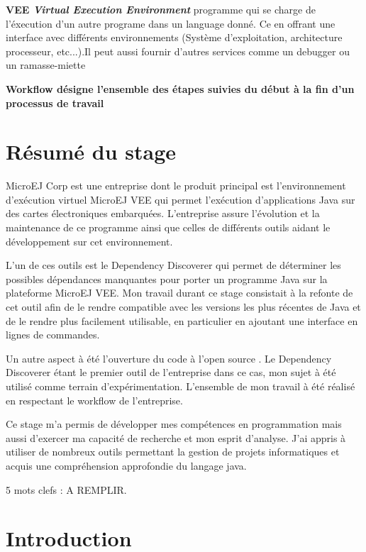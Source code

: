 \documentclass[french,a4paper,12pt]{report}
\begin{document}
\bigskip

\hypertarget{VEE}{\noindent\textbf{VEE \emph{Virtual Execution Environment}} programme qui se charge de l'éxecution d'un autre programe dans un language donné. Ce en offrant une interface avec différents environnements (Système d'exploitation, architecture processeur, etc...).Il peut aussi fournir d'autres services comme un debugger ou un ramasse-miette}

\hypertarget{Workflow}{\noindent\textbf{Workflow désigne l'ensemble des étapes suivies du début à la fin d'un processus de travail}}

\chapter*{Résumé du stage}

MicroEJ Corp est une entreprise dont le produit principal est l'environnement d’exécution virtuel MicroEJ VEE qui permet l’exécution d'applications Java sur des cartes électroniques embarquées. L'entreprise assure l'évolution et la maintenance de ce programme ainsi que celles de différents outils aidant le développement sur cet environnement.

L'un de ces outils est le Dependency Discoverer qui permet de déterminer les possibles dépendances manquantes pour porter un programme Java sur la plateforme MicroEJ VEE. Mon travail durant ce stage consistait à la refonte de cet outil afin de le rendre compatible avec les versions les plus récentes de Java et de le rendre plus facilement utilisable, en particulier en ajoutant une interface en lignes de commandes. 

Un autre aspect à été l'ouverture du code à l'open source . Le Dependency Discoverer étant le premier outil de l'entreprise dans ce cas, mon sujet à été utilisé comme terrain d'expérimentation. L'ensemble de mon travail à été réalisé en respectant le workflow de l'entreprise.

Ce stage m'a permis de développer mes compétences en programmation mais aussi d'exercer ma capacité de recherche et mon esprit d'analyse. J'ai appris à utiliser de nombreux outils permettant la gestion de projets informatiques et acquis une compréhension approfondie du langage java.  

\vspace*{\fill}

5 mots clefs : A REMPLIR.


\chapter{Introduction}
\end{document}
